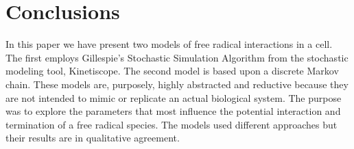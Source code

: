 \documentclass[preprint,12pt,authoryear]{elsarticle}
\begin{document}
%

\section{Conclusions}


In this paper we have present two models of free radical interactions in a cell. The first employs
Gillespie’s Stochastic Simulation Algorithm from the stochastic modeling tool, Kinetiscope. The second
model is based upon a discrete Markov chain. 
These models are, purposely, highly abstracted and reductive because they are not intended to mimic or replicate an actual biological system. 
The purpose was to explore the parameters that most influence the potential interaction and termination of a free radical species. 
The models used different approaches but their results are in qualitative agreement.  
\end{document}
